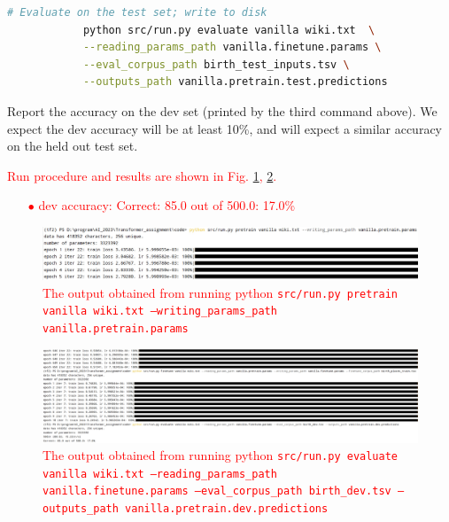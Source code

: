 \documentclass[letterpaper,12pt]{article}
\begin{document}
\begin{itemize}
\begin{lstlisting}[basicstyle=\ttfamily, language=bash]
			# Evaluate on the test set; write to disk
			python src/run.py evaluate vanilla wiki.txt  \
			--reading_params_path vanilla.finetune.params \
			--eval_corpus_path birth_test_inputs.tsv \
			--outputs_path vanilla.pretrain.test.predictions
		\end{lstlisting}
		
		Report the accuracy on the dev set (printed by the third command above). We expect the dev accuracy will be at least 10\%, and will expect a similar accuracy on the held out test set.
		
		\textcolor{red}{Run procedure and results are shown in Fig. \ref{fig: 2.f.process.1}, \ref{fig: 2.f.result.1}.
		\begin{itemize}
			\item [$ \bullet $] dev accuracy: Correct: 85.0 out of 500.0: 17.0\%
		\end{itemize}
		\begin{figure}[htbp] 
			\centering 
			\includegraphics[width=0.9\linewidth]{picture/2.f.process.1}
			\captionsetup{font=small}
			\captionsetup{font=scriptsize}
			\caption{
				\label{fig: 2.f.process.1} %
				The output obtained from running python \texttt{src/run.py pretrain vanilla wiki.txt --writing\_params\_path vanilla.pretrain.params}
			}
		\end{figure}
		\begin{figure}[htbp] 
			\centering 
			\includegraphics[width=0.7\linewidth]{picture/2.f.result.1}
			\captionsetup{font=small}
			\captionsetup{font=scriptsize}
			\caption{
				\label{fig: 2.f.result.1} %
				The output obtained from running python \texttt{src/run.py evaluate vanilla wiki.txt --reading\_params\_path vanilla.finetune.params --eval\_corpus\_path birth\_dev.tsv --outputs\_path vanilla.pretrain.dev.predictions}
			}
		\end{figure}
		}
		

\end{itemize}
\end{document}
